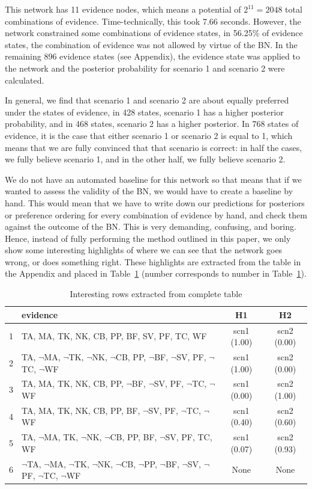 \documentclass[12pt]{article}
\begin{document}
This network has 11 evidence nodes, which means a potential of $2^11 = 2048$ total combinations of evidence. Time-technically, this took 7.66 seconds. However, the network constrained some combinations of evidence states, in 56.25\% of evidence states, the combination of evidence was not allowed by virtue of the BN. In the remaining 896 evidence states (see Appendix), the evidence state was applied to the network and the posterior probability for scenario 1 and scenario 2 were calculated.

In general, we find that scenario 1 and scenario 2 are about equally preferred under the states of evidence, in 428 states, scenario 1 has a higher posterior probability, and in 468 states, scenario 2 has a higher posterior. In 768 states of evidence, it is the case that either scenario 1 or scenario 2 is equal to 1, which means that we are fully convinced that that scenario is correct: in half the cases, we fully believe scenario 1, and in the other half, we fully believe scenario 2.

We do not have an automated baseline for this network so that means that if we wanted to assess the validity of the BN, we would have to create a baseline by hand. This would mean that we have to write down our predictions for posteriors or preference ordering for every combination of evidence by hand, and check them against the outcome of the BN. This is very demanding, confusing, and boring. Hence, instead of fully performing the method outlined in this paper, we only show some interesting highlights of where we can see that the network goes wrong, or does something right. These highlights are extracted from the table in the Appendix and placed in Table~\ref{cases} (number corresponds to number in Table~\ref{cases}).


\begin{table}[htbp]
\begin{center}
\begin{tabular}{|l|l|c|c|}
\hline
 & evidence & H1 & H2  \\
\hline
1 & TA, MA, TK, NK, CB, PP, BF, SV, PF, TC, WF & scn1 (1.00) & scn2 (0.00)\\
2 & TA, $\neg$MA, $\neg$TK, $\neg$NK, $\neg$CB, PP, $\neg$BF, $\neg$SV, PF, $\neg$TC, $\neg$WF & scn1 (1.00) & scn2 (0.00)\\
3 & TA, MA, TK, NK, CB, PP, $\neg$BF, $\neg$SV, PF, $\neg$TC, $\neg$WF & scn1 (0.00) & scn2 (1.00)\\
4 & TA, MA, TK, NK, CB, PP, BF, $\neg$SV, PF, $\neg$TC, $\neg$WF & scn1 (0.40) & scn2 (0.60)\\
5 & TA, $\neg$MA, TK, $\neg$NK, $\neg$CB, PP, BF, $\neg$SV, PF, TC, WF & scn1 (0.07) & scn2 (0.93)\\
6 & $\neg$TA, $\neg$MA, $\neg$TK, $\neg$NK, $\neg$CB, $\neg$PP, $\neg$BF, $\neg$SV, $\neg$PF, $\neg$TC, $\neg$WF & None & None\\

\hline
\end{tabular}
\end{center}
\caption{ Interesting rows extracted from complete table}
\label{cases}
\end{table}
\end{document}
